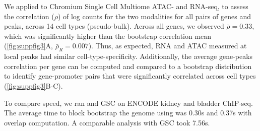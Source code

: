

We applied \bootranges to Chromium Single Cell Multiome
ATAC- and RNA-seq, to assess the correlation ($\rho$) of log counts for the two
modalities for all pairs of genes and peaks, across
14 cell types (pseudo-bulk). Across all genes, we observed
$\bar{\rho} = 0.33$, which was 
significantly higher than the bootstrap correlation mean
(\cref{fig:suppfig3}A, $\bar{\rho}_{R} = 0.007$). Thus, as expected, RNA
and ATAC measured at local peaks had similar cell-type-specificity.
Additionally, the average gene-peaks correlation per gene can be
computed and compared to a bootstrap distribution to
identify gene-promoter pairs that were significantly correlated across cell types (\cref{fig:suppfig3}B-C).

To compare speed, we ran \bootranges and GSC on
ENCODE kidney and bladder ChIP-seq. The average time to
block bootstrap the genome using \bootranges was 0.30s and
0.37s with overlap computation. A comparable analysis with GSC took
7.56s.

